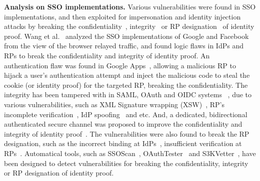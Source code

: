 \noindent\textbf{Analysis on SSO implementations.}
Various vulnerabilities were found in SSO implementations, and then exploited for impersonation and identity injection attacks by breaking the confidentiality~\cite{WangCW12,ccsSunB12,ArmandoCCCPS13,DiscoveringJCS,dimvaLiM16}, integrity~\cite{WangCW12,SomorovskyMSKJ12,WangZLG16,MainkaMS16, MainkaMSW17,dimvaLiM16} or RP designation~\cite{WangZLG16,MainkaMS16,MainkaMSW17,YangLCZ18,dimvaLiM16} of identity proof.
Wang et al.~\cite{WangCW12} analyzed the SSO implementations of Google and Facebook from the view of the browser relayed traffic, and found logic flaws in IdPs and RPs to break the confidentiality and integrity of identity proof.
An authentication flaw was found in Google Apps~\cite{ArmandoCCCPS13}, allowing a malicious RP to hijack a user's authentication attempt and inject the malicious code to steal the cookie (or identity proof) for the targeted RP, breaking the confidentiality.
The integrity has been tampered with in SAML, OAuth and OIDC systems ~\cite{SomorovskyMSKJ12,WangCW12,WangZLG16,MainkaMS16, MainkaMSW17},
 due to various vulnerabilities, such as  XML Signature wrapping (XSW)~\cite{SomorovskyMSKJ12}, RP's incomplete verification~\cite{WangCW12,WangZLG16,MainkaMSW17}, IdP spoofing~\cite{MainkaMS16,MainkaMSW17} and etc.
And, a dedicated, bidirectional authenticated secure channel was proposed to improve the confidentiality and integrity of identity proof~\cite{CaoSBKVC14}.
The vulnerabilities were also found to break the RP designation, such as the incorrect binding  at IdPs~\cite{YangLCZ18,WangZLG16}, insufficient verification at RPs~\cite{MainkaMS16,MainkaMSW17,YangLCZ18}.
Automatical tools, such as SSOScan~\cite{ZhouE14}, OAuthTester~\cite{YangLLZH16} and S3KVetter~\cite{YangLCZ18}, have been designed to detect vulnerabilities for breaking the confidentiality, integrity or RP designation of identity proof.


